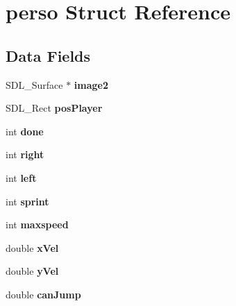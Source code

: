 \hypertarget{structperso}{}\section{perso Struct Reference}
\label{structperso}
\subsection*{Data Fields}
\begin{DoxyCompactItemize}
\item 
S\+D\+L\+\_\+\+Surface $\ast$ {\bfseries image2}\hypertarget{structperso_a62acbc115de845349106a28c73f93aea}{}\label{structperso_a62acbc115de845349106a28c73f93aea}

\item 
S\+D\+L\+\_\+\+Rect {\bfseries pos\+Player}\hypertarget{structperso_aa36fa83b86aac6e58217acdf83f1d1b0}{}\label{structperso_aa36fa83b86aac6e58217acdf83f1d1b0}

\item 
int {\bfseries done}\hypertarget{structperso_a27424a1bed94325802586e357d724d4c}{}\label{structperso_a27424a1bed94325802586e357d724d4c}

\item 
int {\bfseries right}\hypertarget{structperso_a659a8d5f2ffd70918846dd53fd14c04f}{}\label{structperso_a659a8d5f2ffd70918846dd53fd14c04f}

\item 
int {\bfseries left}\hypertarget{structperso_a09b35ffe6af078416f3f9400963764b1}{}\label{structperso_a09b35ffe6af078416f3f9400963764b1}

\item 
int {\bfseries sprint}\hypertarget{structperso_ac0f658e9861cbd772d809d0b8a4527f5}{}\label{structperso_ac0f658e9861cbd772d809d0b8a4527f5}

\item 
int {\bfseries maxspeed}\hypertarget{structperso_ace2be8d984c92ac5bc862c4fae73ccd8}{}\label{structperso_ace2be8d984c92ac5bc862c4fae73ccd8}

\item 
double {\bfseries x\+Vel}\hypertarget{structperso_a72bb6943583c5a7b55639cf164e00677}{}\label{structperso_a72bb6943583c5a7b55639cf164e00677}

\item 
double {\bfseries y\+Vel}\hypertarget{structperso_a4bee30ab165fd9910d8090bcd1d2342d}{}\label{structperso_a4bee30ab165fd9910d8090bcd1d2342d}

\item 
double {\bfseries can\+Jump}\hypertarget{structperso_a9149a0b708d69657fc271ade4cbbb431}{}\label{structperso_a9149a0b708d69657fc271ade4cbbb431}


\end{DoxyCompactItemize}
